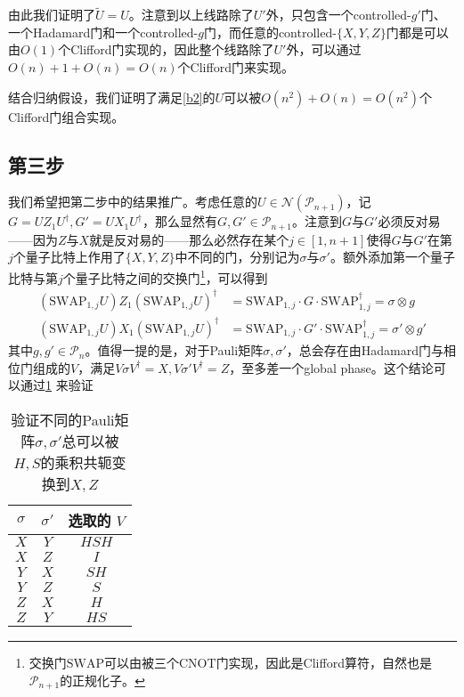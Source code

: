 \documentclass[8pt]{article}
\begin{document}
\begin{appendices}
由此我们证明了$\tilde{U} = U$。注意到以上线路除了$U'$外，只包含一个controlled-$g'$门、一个Hadamard门和一个controlled-$g$门，而任意的controlled-$\{X, Y, Z\}$门都是可以由$O(1)$个Clifford门实现的，因此整个线路除了$U'$外，可以通过$O(n) + 1 + O(n) = O(n)$个Clifford门来实现。

结合归纳假设，我们证明了满足\cref{b2}的$U$可以被$O(n^2) + O(n) = O(n^2)$个Clifford门组合实现。

\subsection{第三步}

我们希望把第二步中的结果推广。考虑任意的$U \in \mathcal N(\mathcal P_{n+1})$，记$G = UZ_1U^{\dagger}, G' = UX_1U^{\dagger}$，那么显然有$G, G' \in \mathcal P_{n+1}$。注意到$G$与$G'$必须反对易——因为$Z$与$X$就是反对易的——那么必然存在某个$j \in [1, n+1]$使得$G$与$G'$在第$j$个量子比特上作用了$\{X, Y, Z\}$中不同的门，分别记为$\sigma$与$\sigma'$。额外添加第一个量子比特与第$j$个量子比特之间的交换门\footnote{交换门$\text{SWAP}$可以由被三个$\text{CNOT}$门实现，因此是Clifford算符，自然也是$\mathcal P_{n+1}$的正规化子。}，可以得到
\begin{equation}
\begin{split}
(\text{SWAP}_{1, j}U)Z_1(\text{SWAP}_{1, j}U)^{\dagger} &= \text{SWAP}_{1, j} \cdot G \cdot \text{SWAP}_{1, j}^{\dagger} = \sigma \otimes g\\
(\text{SWAP}_{1, j}U)X_1(\text{SWAP}_{1, j}U)^{\dagger} &= \text{SWAP}_{1, j} \cdot G' \cdot \text{SWAP}_{1, j}^{\dagger} = \sigma' \otimes g'
\end{split}
\end{equation}
其中$g, g' \in \mathcal{P}_n$。值得一提的是，对于Pauli矩阵$\sigma, \sigma'$，总会存在由Hadamard门与相位门组成的$V$，满足$V\sigma V^{\dagger} = X, V\sigma' V^{\dagger} = Z$，至多差一个global phase。这个结论可以通过\cref{b2table} 来验证

\begin{table}
	\centering
	\begin{tabular}{c|c|c}
		$\sigma$ & $\sigma'$ & 选取的 $V$ \\
		\hline
		$X$ & $Y$ & $HSH$\\
		$X$ & $Z$ & $I$\\
		$Y$ & $X$ & $SH$\\
		$Y$ & $Z$ & $S$\\
		$Z$ & $X$ & $H$\\
		$Z$ & $Y$ & $HS$\\
	\end{tabular}
	\caption{验证不同的Pauli矩阵$\sigma, \sigma'$总可以被$H, S$的乘积共轭变换到$X, Z$}
	\label{b2table}
\end{table}


\end{appendices}
\end{document}
